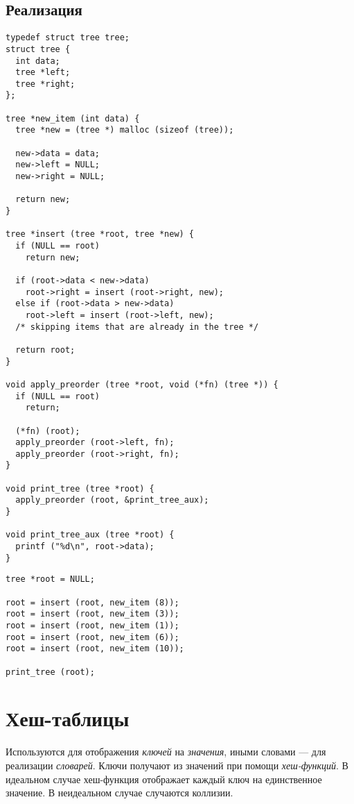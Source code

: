\subsection{Реализация}
\lstset{label=lst:bst-impl,caption=Некоторые операции}
\begin{lstlisting}
typedef struct tree tree;
struct tree {
  int data;
  tree *left;
  tree *right;
};

tree *new_item (int data) {
  tree *new = (tree *) malloc (sizeof (tree));

  new->data = data;
  new->left = NULL;
  new->right = NULL;

  return new;
}

tree *insert (tree *root, tree *new) {
  if (NULL == root)
    return new;

  if (root->data < new->data)
    root->right = insert (root->right, new);
  else if (root->data > new->data)
    root->left = insert (root->left, new);
  /* skipping items that are already in the tree */

  return root;
}

void apply_preorder (tree *root, void (*fn) (tree *)) {
  if (NULL == root)
    return;

  (*fn) (root);
  apply_preorder (root->left, fn);
  apply_preorder (root->right, fn);
}

void print_tree (tree *root) {
  apply_preorder (root, &print_tree_aux);
}

void print_tree_aux (tree *root) {
  printf ("%d\n", root->data);
}
\end{lstlisting}

\lstset{label=lst:bst-usage,caption=Пример использования}
\begin{lstlisting}
tree *root = NULL;

root = insert (root, new_item (8));
root = insert (root, new_item (3));
root = insert (root, new_item (1));
root = insert (root, new_item (6));
root = insert (root, new_item (10));

print_tree (root);
\end{lstlisting}

\section{Хеш-таблицы}
\label{sec:hash-tables}

Используются для отображения \emph{ключей} на \emph{значения}, иными словами --- для реализации \emph{словарей}. Ключи получают из значений при помощи \emph{хеш-функций}. В идеальном случае хеш-функция отображает каждый ключ на единственное значение. В неидеальном случае случаются коллизии.

